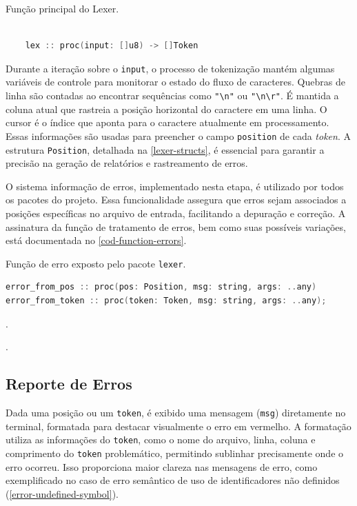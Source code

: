 \begin{codigo}[htb]
        \caption{\small Função principal do Lexer. }
        \label{function-lex}
  \begin{lstlisting}[language = c]
  
    lex :: proc(input: []u8) -> []Token
  \end{lstlisting}
\end{codigo}



Durante a iteração sobre o \texttt{input}, o processo de tokenização mantém algumas variáveis de controle para monitorar o estado do fluxo de caracteres. Quebras de linha são contadas ao encontrar sequências como \verb|"\n"| ou \verb|"\n\r"|. É mantida a coluna atual que rastreia a posição horizontal do caractere em uma linha. O cursor é o índice que aponta para o caractere atualmente em processamento. Essas informações são usadas para preencher o campo \texttt{position} de cada \textit{token}. A estrutura \texttt{Position}, detalhada na \autoref{lexer-structs}, é essencial para garantir a precisão na geração de relatórios e rastreamento de erros.

O sistema informação de erros, implementado nesta etapa, é utilizado por todos os pacotes do projeto. Essa funcionalidade assegura que erros sejam associados a posições específicas no arquivo de entrada, facilitando a depuração e correção. A assinatura da função de tratamento de erros, bem como suas possíveis variações, está documentada no \autoref{cod-function-errors}.


\begin{codigo}[htb]
    \caption{\small Função de erro exposto pelo pacote \texttt{lexer}. }
        \label{cod-function-errors}
\begin{lstlisting}[language=C++]
error_from_pos :: proc(pos: Position, msg: string, args: ..any)
error_from_token :: proc(token: Token, msg: string, args: ..any);
\end{lstlisting}.
\end{codigo}.


\subsection{Reporte de Erros} \label{subsection-erros}


Dada uma posição ou um \texttt{token}, é exibido uma mensagem (\texttt{msg}) diretamente no terminal, formatada para destacar visualmente o erro em vermelho. A formatação utiliza as informações do \texttt{token}, como o nome do arquivo, linha, coluna e comprimento do \texttt{token} problemático, permitindo sublinhar precisamente onde o erro ocorreu. Isso proporciona maior clareza nas mensagens de erro, como exemplificado no caso de erro semântico de uso de identificadores não definidos (\autoref{error-undefined-symbol}).

